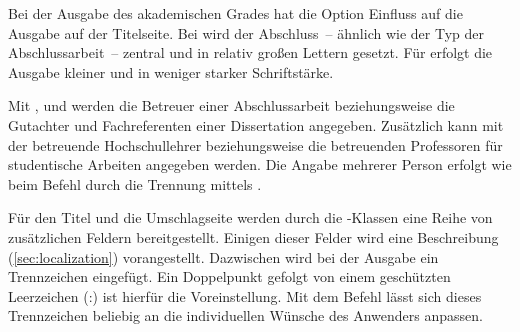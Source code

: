 \begin{DeclareEntity*}{}
\begin{DeclareEntity*}{}
\begin{DeclareEntity*}{}
\begin{Declaration}
Bei der Ausgabe des akademischen Grades hat die Option  
Einfluss auf die Ausgabe auf der Titelseite. Bei  
wird der Abschluss~-- ähnlich wie der Typ der Abschlussarbeit~-- zentral und in 
relativ großen Lettern gesetzt. Für  erfolgt die 
Ausgabe kleiner und in weniger starker Schriftstärke.
\end{Declaration}

\begin{Declaration}
  {}
\begin{Declaration}
  {}
\begin{Declaration}
  {}
\begin{Declaration}
  {}
Mit ,  und  werden die Betreuer 
einer Abschlussarbeit beziehungsweise die Gutachter und Fachreferenten einer 
Dissertation angegeben. Zusätzlich kann mit  der betreuende 
Hochschullehrer beziehungsweise die betreuenden Professoren für studentische 
Arbeiten angegeben werden. Die Angabe mehrerer Person erfolgt wie beim Befehl 
 durch die Trennung mittels .
\end{Declaration}
\end{Declaration}
\end{Declaration}
\end{Declaration}

\begin{Declaration}
  {}
%
Für den Titel und die Umschlagseite werden durch die \TUDScript-Klassen eine 
Reihe von zusätzlichen Feldern bereitgestellt. Einigen dieser Felder wird eine 
Beschreibung (\autoref{sec:localization}) vorangestellt. Dazwischen 
wird bei der Ausgabe ein Trennzeichen eingefügt. Ein Doppelpunkt gefolgt von 
einem geschützten Leerzeichen (:) ist hierfür die 
Voreinstellung. Mit dem Befehl  lässt sich dieses 
Trennzeichen beliebig an die individuellen Wünsche des Anwenders anpassen.
%
\end{Declaration}


\end{DeclareEntity*}
\end{DeclareEntity*}
\end{DeclareEntity*}
